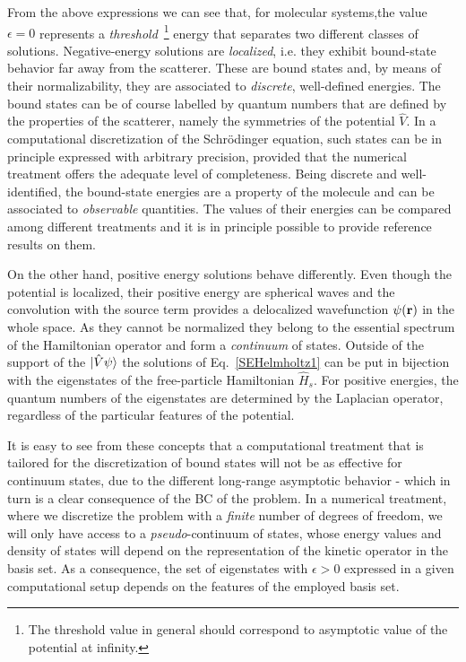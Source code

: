 \documentclass[reprint,aps,prb]{revtex4-1}
\renewcommand{\r}{{\bf r}}
\newcommand{\op}[1]{\hat {#1}}
\begin{document}
From the above expressions we can see that, for molecular systems,the value $\epsilon=0$
represents a \emph{threshold}~\footnote{The threshold value in general should correspond to asymptotic value of the potential at infinity.} 
energy that separates two different classes of solutions.
Negative-energy solutions are \emph{localized}, i.e. they exhibit bound-state behavior far away from the scatterer.
These are bound states and, by means of their normalizability, they are associated to \emph{discrete}, well-defined energies.
The bound states can be of course labelled by quantum numbers that are defined by the properties of the scatterer, namely the
symmetries of the potential $\op V$.
In a computational discretization of the Schr\"odinger equation, such states can be in principle expressed with arbitrary precision, 
provided that the numerical treatment offers the adequate level of completeness. 
Being discrete and well-identified, the bound-state energies are a property of the molecule and can be associated to \emph{observable}
quantities. The values of their energies can be compared among different treatments and it is in principle possible to
provide reference results on them.


On the other hand, positive energy solutions behave differently. 
Even though the potential is localized, their positive energy are 
 spherical waves and the convolution with the source term provides a delocalized wavefunction $\psi(\r)$ in the whole space.
As they cannot be normalized they belong to the essential spectrum of the Hamiltonian operator and form a \emph{continuum} of states.
Outside of the support of the $\ket{\op V \psi}$ the solutions of Eq.~\eqref{SEHelmholtz1} can be put in bijection with the eigenstates of the 
free-particle Hamiltonian $\op H_s$. For positive energies, the quantum numbers of the eigenstates are determined by the Laplacian operator, 
regardless of the particular features of the potential.

It is easy to see from these concepts that a computational treatment that is tailored for the discretization of bound states
will not be as effective for continuum states, due to the different long-range asymptotic behavior - which in turn is a clear consequence of the 
BC of the problem. In a numerical treatment, where we discretize the problem with a \emph{finite}
number of degrees of freedom, we will only have access to a \emph{pseudo}-continuum of states,
whose energy values and density of states will depend on the representation of the kinetic operator
in the basis set. As a consequence, the set of eigenstates with $\epsilon > 0$ expressed in a given computational setup depends on the features of the employed basis set.
\end{document}
